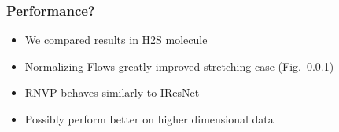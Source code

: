 \begin{frame}
    \frametitle{Performance?}
    \begin{itemize}
        \item We compared results in H2S molecule
        \item Normalizing Flows greatly improved stretching case (Fig.~\ref{})
        \item RNVP behaves similarly to IResNet
        \item Possibly perform better on higher dimensional data
    \end{itemize}
\end{frame}